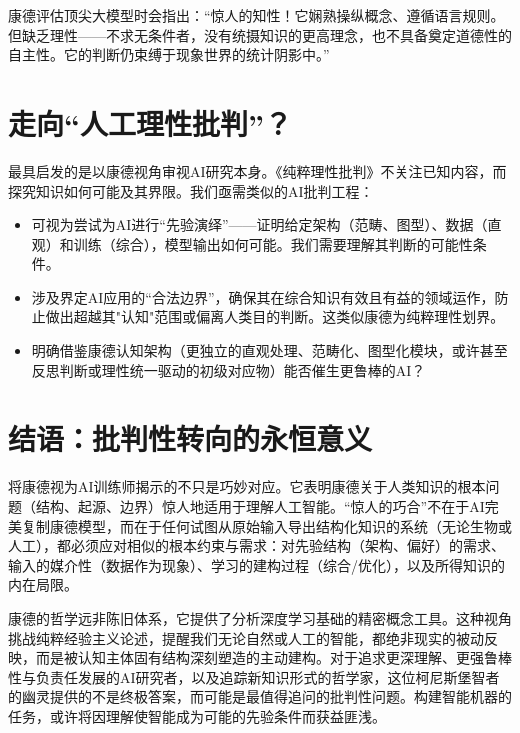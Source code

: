 康德评估顶尖大模型时会指出：“惊人的知性！它娴熟操纵概念、遵循语言规则。但缺乏理性——不求无条件者，没有统摄知识的更高理念，也不具备奠定道德性的自主性。它的判断仍束缚于现象世界的统计阴影中。”

\section{走向“人工理性批判”？}

最具启发的是以康德视角审视AI研究本身。《纯粹理性批判》不关注已知内容，而探究知识如何可能及其界限。我们亟需类似的AI批判工程：
\begin{itemize}
\item{} 可视为尝试为AI进行“先验演绎”——证明给定架构（范畴、图型）、数据（直观）和训练（综合），模型输出如何可能。我们需要理解其判断的可能性条件。
\item{} 涉及界定AI应用的“合法边界”，确保其在综合知识有效且有益的领域运作，防止做出超越其"认知"范围或偏离人类目的判断。这类似康德为纯粹理性划界。
\item{} 明确借鉴康德认知架构（更独立的直观处理、范畴化、图型化模块，或许甚至反思判断或理性统一驱动的初级对应物）能否催生更鲁棒的AI？
\end{itemize}

\section*{结语：批判性转向的永恒意义}

将康德视为AI训练师揭示的不只是巧妙对应。它表明康德关于人类知识的根本问题（结构、起源、边界）惊人地适用于理解人工智能。“惊人的巧合”不在于AI完美复制康德模型，而在于任何试图从原始输入导出结构化知识的系统（无论生物或人工），都必须应对相似的根本约束与需求：对先验结构（架构、偏好）的需求、输入的媒介性（数据作为现象）、学习的建构过程（综合/优化），以及所得知识的内在局限。

康德的哲学远非陈旧体系，它提供了分析深度学习基础的精密概念工具。这种视角挑战纯粹经验主义论述，提醒我们无论自然或人工的智能，都绝非现实的被动反映，而是被认知主体固有结构深刻塑造的主动建构。对于追求更深理解、更强鲁棒性与负责任发展的AI研究者，以及追踪新知识形式的哲学家，这位柯尼斯堡智者的幽灵提供的不是终极答案，而可能是最值得追问的批判性问题。构建智能机器的任务，或许将因理解使智能成为可能的先验条件而获益匪浅。
